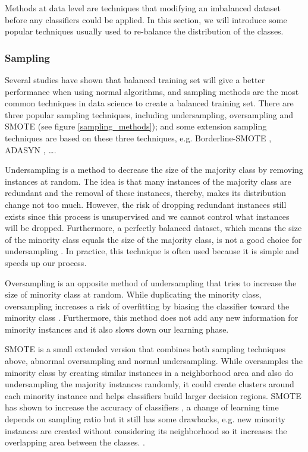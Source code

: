 Methods at data level are techniques that modifying an imbalanced dataset before any classifiers could be applied. In this section, we will introduce some popular techniques usually used to re-balance the distribution of the classes.


\subsubsection*{Sampling}
\label{sampling}

Several studies \citep{weiss2001effect, laurikkala2001improving, estabrooks2004multiple} have shown that balanced training set will give a better performance when using normal algorithms, and sampling methods are the most common techniques in data science to create a balanced training set. There are three popular sampling techniques, including undersampling, oversampling and SMOTE (see figure \ref{sampling_methods}); and some extension sampling techniques are based on these three techniques, e.g. Borderline-SMOTE \citep{han2005borderline}, ADASYN \citep{he2008adasyn}, \dots.

Undersampling \citep{drummond2003c4} is a method to decrease the size of the majority class by removing instances at random. The idea is that many instances of the majority class are redundant and the removal of these instances, thereby, makes its distribution change not too much. However, the risk of dropping redundant instances still exists since this process is unsupervised and we cannot control what instances will be dropped. Furthermore, a perfectly balanced dataset, which means the size of the minority class equals the size of the majority class, is not a good choice for undersampling \citep{dal2015calibrating}. In practice, this technique is often used because it is simple and speeds up our process.

Oversampling \citep{drummond2003c4} is an opposite method of undersampling that tries to increase the size of minority class at random. While duplicating the minority class, oversampling increases a risk of overfitting by biasing the classifier toward the minority class \citep{drummond2003c4}. Furthermore, this method does not add any new information for minority instances and it also slows down our learning phase.

SMOTE \citep{chawla2002smote} is a small extended version that combines both sampling techniques above, abnormal oversampling and normal undersampling. While oversamples the minority class by creating similar instances in a neighborhood area and also do undersampling the majority instances randomly, it could create clusters around each minority instance and helps classifiers build larger decision regions. SMOTE has shown to increase the accuracy of classifiers \citep{chawla2002smote}, a change of learning time depends on sampling ratio but it still has some drawbacks, e.g. new minority instances are created without considering its neighborhood so it increases the overlapping area between the classes. \citep{wang2004imbalanced}.


